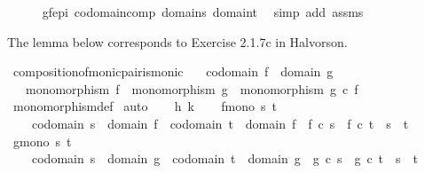 \begin{isabellebody}
\ \ \ \ \isamarkupfalse%
\ gf{\isacharunderscore}{\kern0pt}epi\ codomain{\isacharunderscore}{\kern0pt}comp\ domain{\isacharunderscore}{\kern0pt}s\ domain{\isacharunderscore}{\kern0pt}t\ \isamarkupfalse%
\ {\isacharparenleft}{\kern0pt}simp\ add{\isacharcolon}{\kern0pt}\ assms{\isacharparenright}{\kern0pt}\isanewline
{}\isamarkupfalse%
%
\endisatagproof
{\isafoldproof}%
%
\isadelimproof
%
\endisadelimproof
%
\begin{isamarkuptext}%
The lemma below corresponds to Exercise 2.1.7c in Halvorson.%
\end{isamarkuptext}\isamarkuptrue%
\isamarkupfalse%
\ composition{\isacharunderscore}{\kern0pt}of{\isacharunderscore}{\kern0pt}monic{\isacharunderscore}{\kern0pt}pair{\isacharunderscore}{\kern0pt}is{\isacharunderscore}{\kern0pt}monic{\isacharcolon}{\kern0pt}\isanewline
\ \ \ {\isachardoublequoteopen}codomain\ f\ {\isacharequal}{\kern0pt}\ domain\ g{\isachardoublequoteclose}\isanewline
\ \ \ {\isachardoublequoteopen}monomorphism\ f\ {\isasymLongrightarrow}\ monomorphism\ g\ {\isasymLongrightarrow}\ monomorphism\ {\isacharparenleft}{\kern0pt}g\ {\isasymcirc}\isactrlsub c\ f{\isacharparenright}{\kern0pt}{\isachardoublequoteclose}\isanewline
%
\isadelimproof
\ \ %
\endisadelimproof
%
\isatagproof
{}\isamarkupfalse%
\ monomorphism{\isacharunderscore}{\kern0pt}def\isanewline
{}\isamarkupfalse%
\ auto\isanewline
\ \ \isamarkupfalse%
\ h\ k\isanewline
\ \ \isamarkupfalse%
\ f{\isacharunderscore}{\kern0pt}mono{\isacharcolon}{\kern0pt}\ {\isachardoublequoteopen}{\isasymforall}s\ t{\isachardot}{\kern0pt}\ \isanewline
\ \ \ \ codomain\ s\ {\isacharequal}{\kern0pt}\ domain\ f\ {\isasymand}\ codomain\ t\ {\isacharequal}{\kern0pt}\ domain\ f\ {\isasymlongrightarrow}\ f\ {\isasymcirc}\isactrlsub c\ s\ {\isacharequal}{\kern0pt}\ f\ {\isasymcirc}\isactrlsub c\ t\ {\isasymlongrightarrow}\ s\ {\isacharequal}{\kern0pt}\ t{\isachardoublequoteclose}\isanewline
\ \ \isamarkupfalse%
\ g{\isacharunderscore}{\kern0pt}mono{\isacharcolon}{\kern0pt}\ {\isachardoublequoteopen}{\isasymforall}s{\isachardot}{\kern0pt}\ {\isasymforall}t{\isachardot}{\kern0pt}\ \isanewline
\ \ \ \ codomain\ s\ {\isacharequal}{\kern0pt}\ domain\ g\ {\isasymand}\ codomain\ t\ {\isacharequal}{\kern0pt}\ domain\ g\ {\isasymlongrightarrow}\ g\ {\isasymcirc}\isactrlsub c\ s\ {\isacharequal}{\kern0pt}\ g\ {\isasymcirc}\isactrlsub c\ t\ {\isasymlongrightarrow}\ s\ {\isacharequal}{\kern0pt}\ t{\isachardoublequoteclose}\isanewline

\end{isabellebody}
